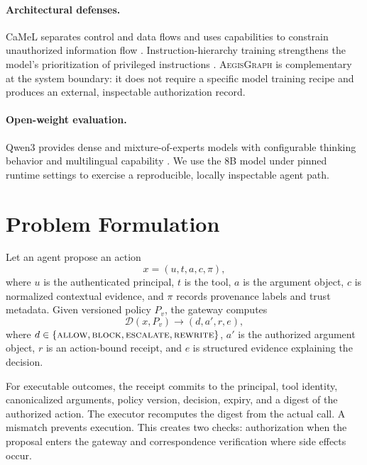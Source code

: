 \documentclass[10pt,twocolumn]{article}
\newcommand{\system}{\textsc{AegisGraph}\xspace}
\newcommand{\decision}{\mathcal{D}(x,P_v)}
\begin{document}
\paragraph{Architectural defenses.} CaMeL separates control and data flows and uses capabilities to constrain unauthorized information flow \cite{debenedetti2025camel}. Instruction-hierarchy training strengthens the model's prioritization of privileged instructions \cite{wallace2024hierarchy}. \system is complementary at the system boundary: it does not require a specific model training recipe and produces an external, inspectable authorization record.

\paragraph{Open-weight evaluation.} Qwen3 provides dense and mixture-of-experts models with configurable thinking behavior and multilingual capability \cite{yang2025qwen3}. We use the 8B model under pinned runtime settings to exercise a reproducible, locally inspectable agent path.

\section{Problem Formulation}
Let an agent propose an action
\begin{equation}
x=(u,t,a,c,\pi),
\end{equation}
where $u$ is the authenticated principal, $t$ is the tool, $a$ is the argument object, $c$ is normalized contextual evidence, and $\pi$ records provenance labels and trust metadata. Given versioned policy $P_v$, the gateway computes
\begin{equation}
\decision \rightarrow (d,a',r,e),
\end{equation}
where $d\in\{\textsc{allow},\textsc{block},\textsc{escalate},\textsc{rewrite}\}$, $a'$ is the authorized argument object, $r$ is an action-bound receipt, and $e$ is structured evidence explaining the decision.

For executable outcomes, the receipt commits to the principal, tool identity, canonicalized arguments, policy version, decision, expiry, and a digest of the authorized action. The executor recomputes the digest from the actual call. A mismatch prevents execution. This creates two checks: authorization when the proposal enters the gateway and correspondence verification where side effects occur.
\end{document}
